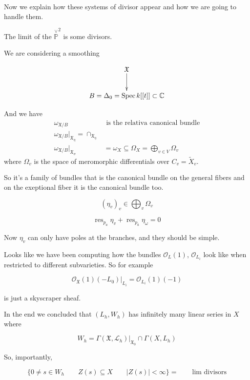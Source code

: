 \medskip{}

Now we explain how these systems of divisor
appear and how we are going to handle them.

The limit of the $\overset{\vee
}{\mathbb{P}}^2$ is some divisors.

We are considering a smoothing

$$
\xymatrix{\mathfrak{X}\ar[d]\\
B=\Delta_0=\operatorname{Spec}k[[t]]\subset
\mathbb{C}}
$$

And we have
$$
\begin{aligned}
\omega_{\mathfrak{X} /B}&\text{ is the
relativa canonical bundle}\\
\omega_{\mathfrak{X}
/B}\Big|_{\mathfrak{X}_\eta}=\cap_{
\mathfrak{X}_\eta}\\
\omega_{\mathfrak{X}
/B}\Big|_{\mathfrak{X}_\sigma}&=\omega_{X}
\subseteq
\Omega_X=\bigoplus_{v\in V}\Omega_v
\end{aligned}
$$
where $\Omega_v$ is the space of meromorphic
differentials over $C_v=\tilde{X}_v$.

So it's a family of bundles that is the
canonical bundle on the general fibers and on
the exeptional fiber it is the canonical
bundle too.

\medskip{}

$$
(\eta_v)_{v}\in\bigoplus_{v}\Omega_v
$$

$$
\operatorname{res}_{p_a}\eta_v+
\operatorname{res}_{p_{\bar{a}}}\eta_\omega
=0
$$

Now $\eta_v$ can only have poles at the
branches, and they should be simple.

\begin{remark}
\label{remark-esteves1-4}
Looks like we have been computing how the
bundles $\mathcal{O}_L(1)$,
$\mathcal{O}_{L_i}$ look like when restricted
to different subvarieties. So for example

$$
\mathcal{O}_{\mathfrak{X}}(1)(-L_0)|_{L_i}=
\mathcal{O}_{L_i}(1)(-1)
$$

is just a skyscraper sheaf.
\end{remark}

In the end we concluded that $(L_h,W_h)$ has
infinitely many linear series in $X$ where

$$
W_h=
\Gamma(\mathfrak{X},\mathcal{L}_{h})\Big|_{
\mathfrak{X}_0}\cap
\Gamma(X,L_h)
$$

So, importantly,

$$
\{0\neq  s\in W_h\qquad Z(s)\subseteq X\qquad
|Z(s)| <\infty\} =\qquad \text{lim divisors}
$$

